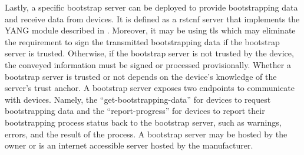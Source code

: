 \begin{itemize}
Lastly, a specific bootstrap server can be deployed to provide bootstrapping data and receive data from devices. It is defined as a \gls{rstcnf} server that implements the YANG module described in \cite[Section~7]{sztp}. Moreover, it may be using \gls{tls} which may eliminate the requirement to sign the transmitted bootstrapping data if the bootstrap server is trusted. Otherwise, if the bootstrap server is not trusted by the device, the conveyed information must be signed or processed provisionally. Whether a bootstrap server is trusted or not depends on the device’s knowledge of the server’s trust anchor. A bootstrap server exposes two endpoints to communicate with devices. Namely, the ``get-bootstrapping-data” for devices to request bootstrapping data and the ``report-progress” for devices to report their bootstrapping process status back to the bootstrap server, such as warnings, errors, and the result of the process. A bootstrap server may be hosted by the owner or is an internet accessible server hosted by the manufacturer.


\end{itemize}
